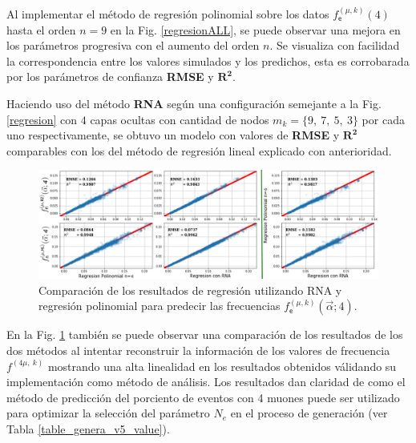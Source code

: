 Al implementar el método de regresión polinomial sobre los datos 
$f^{(\mu, k)}_\textsf{e} (4)$ 
hasta el orden $n = 9$ en la Fig. \ref{regresionALL}, se puede observar una mejora en los parámetros progresiva con el aumento del orden $n$. Se visualiza con facilidad la correspondencia entre los valores simulados y los predichos, esta es corrobarada por los parámetros de confianza \textbf{RMSE} y $\mathbf{R^2}$. 

Haciendo uso del método \textbf{RNA} según una configuración semejante a la Fig. \ref{regresion} con $4$ capas ocultas con cantidad de nodos $m_k=\{9,~7,~5,~3\}$ por cada uno respectivamente, se obtuvo un modelo con valores de \textbf{RMSE} y $\mathbf{R^2}$ comparables con los del método de regresión lineal explicado con anterioridad.

\begin{figure}[!ht]
\centering
\includegraphics[width=1\textwidth]{Simulacion/imagenes/ML_Entries.png}
\caption{Comparación de los resultados de regresión utilizando RNA y regresión polinomial para predecir las frecuencias $f^{(\mu, k)}_\textsf{e} (\vec{\alpha}; 4)$.}
\label{regresionALL1}
\end{figure}

En la Fig. \ref{regresionALL1} también se puede observar una comparación de los resultados de los dos métodos al intentar reconstruir la información de los valores de frecuencia $f^{(4\mu,~k)}$ mostrando una alta linealidad en los resultados obtenidos válidando su implementación como método de análisis. Los resultados dan claridad de como el método de predicción del porciento de eventos con 4 muones puede ser utilizado para optimizar la selección del parámetro $N_e$ en el proceso de generación (ver Tabla \ref{table_genera_v5_value}).


